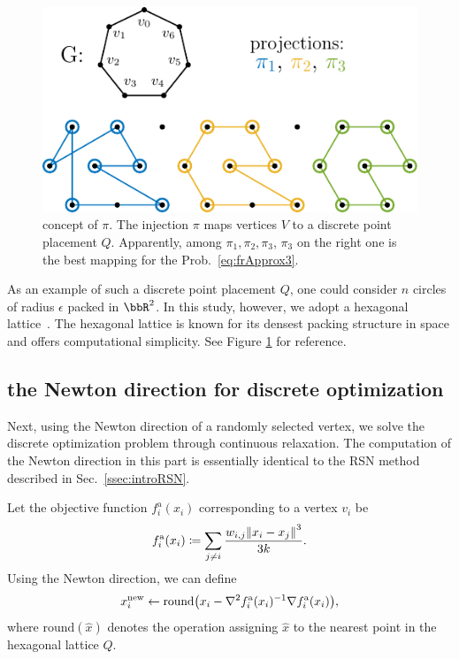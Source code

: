 \documentclass[dvipdfmx,10pt,journal,compsoc]{IEEEtran}
\newcommand{\defeq}{\coloneqq}
\begin{document}
\begin{figure}[t]
    \centering
    \includegraphics[width=\columnwidth]{pi/pi.pdf}
    \caption{
        concept of $\pi$.
        The injection $\pi$ maps vertices $V$ to a discrete point placement $Q$.
        Apparently, among $\pi_1, \pi_2, \pi_3$, $\pi_3$ on the right one is the best mapping for the Prob.~\eqref{eq:frApprox3}.
    }
    \label{fig:pi}
\end{figure}

As an example of such a discrete point placement $Q$, one could consider $n$ circles of radius $\epsilon$ packed in $\bbR^2$.
In this study, however, we adopt a hexagonal lattice~\cite{patelHexagonalGrids2013,s22145179}.
The hexagonal lattice is known for its densest packing structure in space and offers computational simplicity.
See Figure \ref{fig:pi} for reference.

\subsection{the Newton direction for discrete optimization}\label{ssec:newtonDirection}

Next, using the Newton direction of a randomly selected vertex, we solve the discrete optimization problem through continuous relaxation. The computation of the Newton direction in this part is essentially identical to the RSN method described in Sec.~\ref{ssec:introRSN}.

Let the objective function $f^{\mathrm{a}}_i(x_i)$ corresponding to a vertex $v_i$ be
\begin{equation*}
    f^{\mathrm{a}}_i(x_i) \defeq \sum_{j \neq i} \frac{w_{i,j}\norm{x_i - x_j}^3}{3k}.
\end{equation*}
Using the Newton direction, we can define
\begin{equation*}
    x_i^\mathrm{new} \gets \mathrm{round}\qty(x_i - \nabla^2 f^{\mathrm{a}}_i(x_i)^{-1} \nabla f^{\mathrm{a}}_i(x_i)),
\end{equation*}
where $\mathrm{round}(\hat{x})$ denotes the operation assigning $\hat{x}$ to the nearest point in the hexagonal lattice $Q$.
\end{document}
